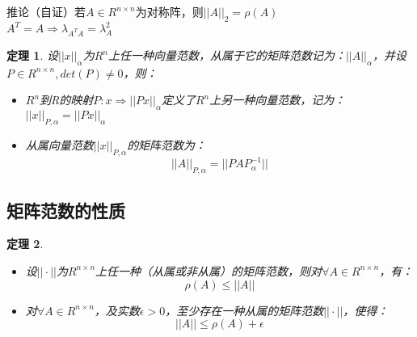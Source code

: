 \documentclass[a4paper]{article}
\newtheorem{theorem}{定理}[section]
\begin{document}
推论（自证）若$A\in R^{n\times n}$为对称阵，则$||A||_2=\rho(A)$\\
$A^T=A \Rightarrow \lambda_{A^TA} = \lambda_{A}^2$

\begin{theorem}
\label{theorem_15}
设$||x||_\alpha$为$R^n$上任一种向量范数，从属于它的矩阵范数记为：$||A||_\alpha$，并设$P \in R^{n\times n}, det(P) \neq 0$，则：
\begin{itemize}
\item $R^n$到R的映射$P: x \Rightarrow ||Px||_\alpha$定义了$R^n$上另一种向量范数，记为：$||x||_{P, \alpha}=||Px||_\alpha$
\item 从属向量范数$||x||_{P, \alpha}$的矩阵范数为：\\
$$||A||_{P, \alpha}=||PAP^{-1}_\alpha||$$
\end{itemize}
\end{theorem}

\subsection{矩阵范数的性质}
\begin{theorem}
  \label{theorem:rho}
\begin{itemize}
\item 设$||\cdot||$为$R^{n\times n}$上任一种（从属或非从属）的矩阵范数，则对$\forall A \in R^{n\times n}$，有：
$$\rho(A) \le ||A||$$
\item 对$\forall A \in R^{n\times n}$，及实数$\epsilon > 0$，至少存在一种从属的矩阵范数$||\cdot||$，使得：
$$||A||\le \rho(A)+\epsilon$$
\end{itemize}
\end{theorem}
\end{document}
